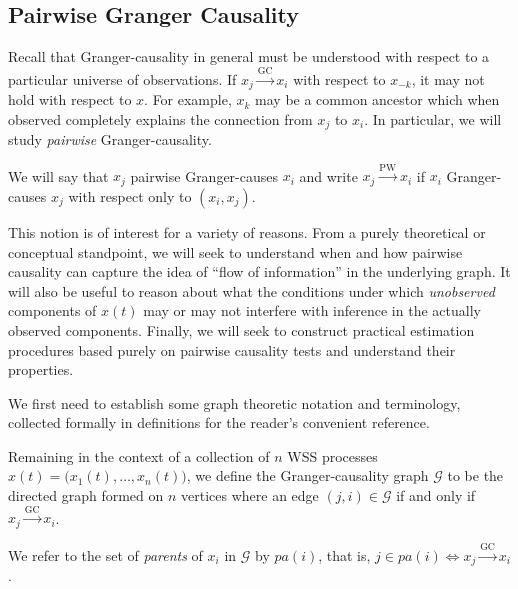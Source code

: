 \documentclass[12pt]{article}
\def\gc{\overset{\text{GC}}{\rightarrow}}  %
\def\pwgc{\overset{\text{PW}}{\rightarrow}}  %
\def\gcg{\mathcal{G}}  %
\newcommand{\pa}[1]{pa(#1)}  %
\begin{document}
\subsection{Pairwise Granger Causality}
\label{sec:pwgc}
Recall that Granger-causality in general must be understood with
respect to a particular universe of observations.  If $x_j \gc x_i$
with respect to $x_{-k}$, it may not hold with respect to $x$.  For
example, $x_k$ may be a common ancestor which when observed completely
explains the connection from $x_j$ to $x_i$.  In particular, we will
study \textit{pairwise} Granger-causality.

\begin{definition}
  We will say that $x_j$ pairwise Granger-causes $x_i$ and write
  $x_j \pwgc x_i$ if $x_i$ Granger-causes $x_j$ with respect only to
  $(x_i, x_j)$.
\end{definition}

This notion is of interest for a variety of reasons.  From a purely
theoretical or conceptual standpoint, we will seek to understand when
and how pairwise causality can capture the idea of ``flow of
information'' in the underlying graph.  It will also be useful to
reason about what the conditions under which \textit{unobserved}
components of $x(t)$ may or may not interfere with inference in the
actually observed components.  Finally, we will seek to construct
practical estimation procedures based purely on pairwise causality
tests and understand their properties.

We first need to establish some graph theoretic notation and
terminology, collected formally in definitions for the reader's
convenient reference.

\begin{definition}

Remaining in the context of a collection of $n$ WSS processes
$x(t) = \big(x_1(t), \ldots, x_n(t)\big)$, we define the Granger-causality
graph $\gcg$ to be the directed graph formed on $n$ vertices where an
edge $(j, i) \in \gcg$ if and only if $x_j \gc x_i$.

We refer to the set of \textit{parents} of $x_i$ in $\gcg$ by
$\pa{i}$, that is, $j \in \pa{i} \iff x_j \gc x_i$.
\end{definition}
\end{document}
